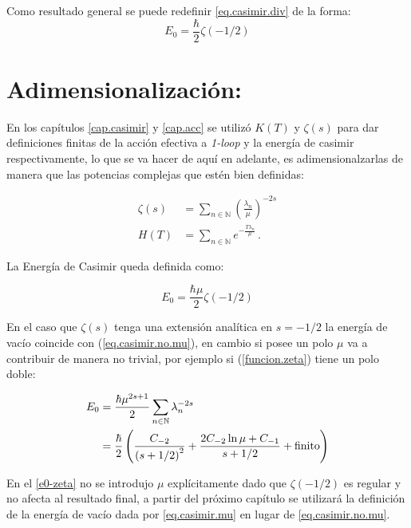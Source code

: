 Como resultado general se puede redefinir \ref{eq.casimir.div} de la forma:
\begin{equation}
E _0 = \frac{\hbar}{2} \zeta  (-1/2)
\label{eq.casimir.no.mu}
\end{equation}

\bigskip

\section{Adimensionalización:}

\medskip

En los capítulos \ref{cap.casimir} y \ref{cap.acc} se utilizó $K(T)$ y $\zeta (s)$ para dar definiciones finitas de la acción efectiva a {\it 1-loop} y la energía de casimir respectivamente, lo que se va hacer de aquí en adelante, es adimensionalzarlas de manera que las potencias complejas que estén bien definidas:

\begin{equation}
\begin{aligned}
\zeta  (s) &= \sum\limits_{n \in \mathbb N} \left( \frac{\lambda _n}{\mu }  \right) ^{-2s } \\[10pt]
H \left( T \right)  &= \sum\limits_{n \in \mathbb N} e ^{- \frac{T \lambda _{n}}{\mu} } \, .
\end{aligned}
\end{equation}

La Energía de Casimir queda definida como:

\begin{equation}
E _0 = \frac{\hbar \mu}{2} \zeta  (-1/2)
\label{eq.casimir.mu}
\end{equation}

En el caso que $\zeta (s)$ tenga una extensión analítica en $s=-1/2$ la energía de vacío coincide con (\ref{eq.casimir.no.mu}), en cambio si posee un polo $\mu$ va a contribuir de manera no trivial, por ejemplo si (\ref{funcion.zeta}) tiene un polo doble:

\begin{equation}
\begin{aligned}
E _0 &= 
\frac{\hbar \mu ^{2s+1}}{2} 
\sum\limits_{n \in \mathbb N}  \lambda _n   ^{-2s } \\ &= 
\frac{\hbar }{2} 
\left(
		\frac{C _{-2}}{ \left( s+1/2 \right) ^2} + \frac{2 C _{-2} \ln \mu + C _{-1}}{s+1/2} + {\rm finito} 
		\right) 
\end{aligned}
\end{equation}

En el \ref{e0-zeta} no se introdujo $\mu$ explícitamente dado que $\zeta (-1/2)$ es regular y no afecta al resultado final, a partir del próximo capítulo se utilizará la definición de la energía de vacío dada por \ref{eq.casimir.mu} en lugar de \ref{eq.casimir.no.mu}.
